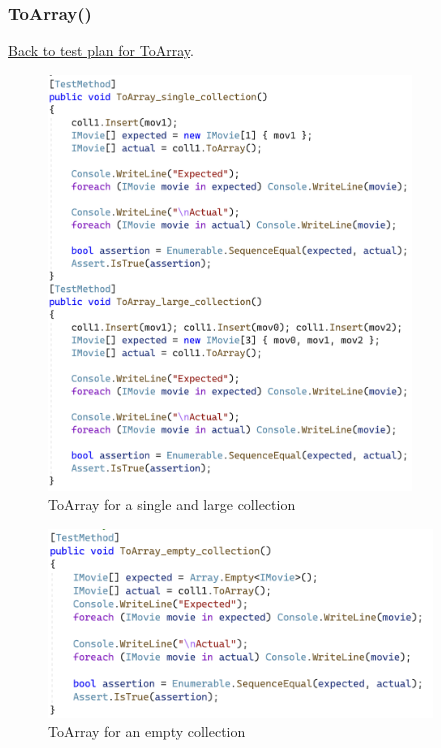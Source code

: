 \documentclass[a4paper]{article}
\begin{document}
\subsubsection{ToArray{()}}
\hyperlink{subsubsection.3.2.3}{Back to test plan for ToArray}.
\begin{figure}[H]
    \includegraphics[height=11cm]{data/ToArray_single_large.png}
    \caption{ToArray for a single and large collection}
\end{figure}
\begin{figure}[H]
    \includegraphics[height=5cm]{data/ToArray_empty_collection.png}
    \caption{ToArray for an empty collection}
\end{figure}
\end{document}
